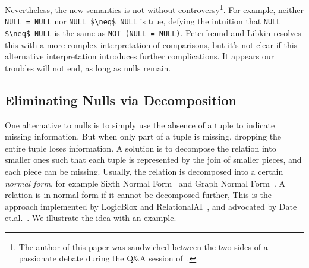 \documentclass[sigconf]{acmart}
\begin{document}
Nevertheless, the new semantics is not without 
 controversy\footnote{The author of this paper was sandwiched between the two sides of 
 a passionate debate during the Q\&A session of~\cite{DBLP:conf/pods/LibkinP23}.}.
For example, neither \lstinline|NULL = NULL| nor \lstinline|NULL $\neq$ NULL|
 is true, defying the intuition that \lstinline|NULL $\neq$ NULL|
 is the same as \lstinline|NOT (NULL = NULL)|.
Peterfreund and Libkin resolves this with
 a more complex interpretation of comparisons,
 but it's not clear if this alternative interpretation
 introduces further complications.
It appears our troubles will not end, 
 as long as nulls remain.

\subsection{Eliminating Nulls via Decomposition}
One alternative to nulls is to simply
 use the absence of a tuple to indicate missing information.
But when only part of a tuple is missing, 
 dropping the entire tuple loses information.
A solution is to decompose the relation into smaller ones
 such that each tuple is represented by the join 
 of smaller pieces, and each piece can be missing.
Usually, the relation is decomposed into a certain 
 {\em normal form}, 
 for example Sixth Normal Form~\cite{DBLP:books/daglib/0014409}
 and Graph Normal Form~\cite{RAIDocumentation}.
A relation is in normal form if it cannot be decomposed further,
This is the approach implemented by LogicBlox 
 and RelationalAI~\cite{RAIDocumentation,DBLP:conf/sigmod/ArefCGKOPVW15},
 and advocated by Date et.al.~\cite{DBLP:journals/sigmod/Date08,DBLP:books/daglib/0014409}.
We illustrate the idea with an example.

\end{document}
